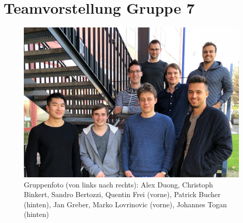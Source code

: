 \section*{Teamvorstellung Gruppe 7}

\begin{figure}[H]
    \centering
    \includegraphics[width=0.9\linewidth]{pics/team.jpg}
    \caption{Gruppenfoto (von links nach rechts): Alex Duong, Christoph Binkert, Sandro Bertozzi, Quentin Frei (vorne), Patrick Bucher (hinten), Jan Greber, Marko Lovrinovic (vorne), Johannes Togan (hinten)}
    \label{fig:team}
\end{figure}

